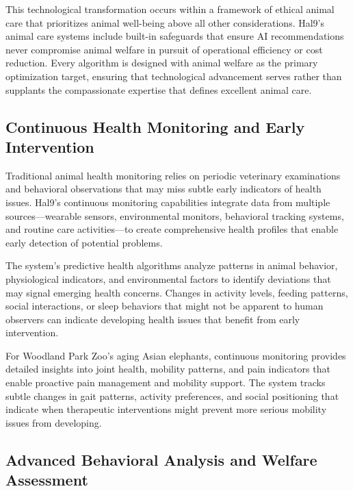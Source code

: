 \documentclass[
  Letterpaper,
]{scrbook}
\begin{document}
This technological transformation occurs within a framework of ethical
animal care that prioritizes animal well-being above all other
considerations. Hal9's animal care systems include built-in safeguards
that ensure AI recommendations never compromise animal welfare in
pursuit of operational efficiency or cost reduction. Every algorithm is
designed with animal welfare as the primary optimization target,
ensuring that technological advancement serves rather than supplants the
compassionate expertise that defines excellent animal care.

\subsection{Continuous Health Monitoring and Early
Intervention}\label{continuous-health-monitoring-and-early-intervention}

Traditional animal health monitoring relies on periodic veterinary
examinations and behavioral observations that may miss subtle early
indicators of health issues. Hal9's continuous monitoring capabilities
integrate data from multiple sources---wearable sensors, environmental
monitors, behavioral tracking systems, and routine care activities---to
create comprehensive health profiles that enable early detection of
potential problems.

The system's predictive health algorithms analyze patterns in animal
behavior, physiological indicators, and environmental factors to
identify deviations that may signal emerging health concerns. Changes in
activity levels, feeding patterns, social interactions, or sleep
behaviors that might not be apparent to human observers can indicate
developing health issues that benefit from early intervention.

For Woodland Park Zoo's aging Asian elephants, continuous monitoring
provides detailed insights into joint health, mobility patterns, and
pain indicators that enable proactive pain management and mobility
support. The system tracks subtle changes in gait patterns, activity
preferences, and social positioning that indicate when therapeutic
interventions might prevent more serious mobility issues from
developing.

\subsection{Advanced Behavioral Analysis and Welfare
Assessment}\label{advanced-behavioral-analysis-and-welfare-assessment}
\end{document}
